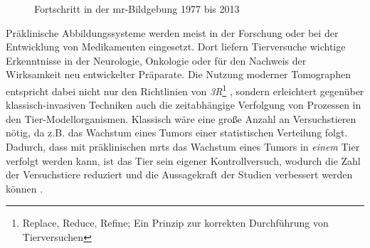 \begin{figure}[H]
	\centering
	\hfill
	\caption{Fortschritt in der \gls{mr}-Bildgebung 1977 bis 2013}
	\label{fig:fortschritt}
\end{figure}

Präklinische Abbildungssysteme werden meist in der Forschung oder bei der Entwicklung von Medikamenten eingesetzt. Dort liefern Tierversuche wichtige Erkenntnisse in der Neurologie, Onkologie oder für den Nachweis der Wirksamkeit neu entwickelter Präparate. Die Nutzung moderner Tomographen entspricht dabei nicht nur den Richtlinien von \textit{3R}\footnote{Replace, Reduce, Refine; Ein Prinzip zur korrekten Durchführung von Tierversuchen} \cite{Russell1992}, sondern erleichtert gegenüber klassisch-invasiven Techniken auch die zeitabhängige Verfolgung von Prozessen in den Tier-Modellorganismen. Klassisch wäre eine große Anzahl an Versuchstieren nötig, da z.B. das Wachstum eines Tumors einer statistischen Verteilung folgt. Dadurch, dass mit präklinischen \gls{mrt}s das Wachstum eines Tumors in \emph{einem} Tier verfolgt werden kann, ist das Tier sein eigener Kontrollversuch, wodurch die Zahl der Versuchstiere reduziert und die Aussagekraft der Studien verbessert werden können \cite{Bradley2013}.

